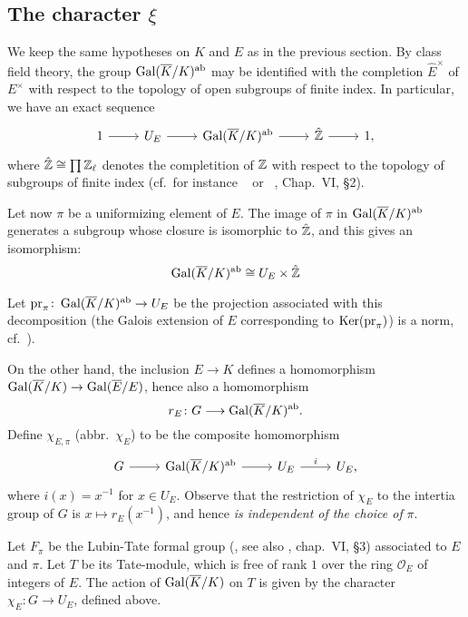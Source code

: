 \begin{subappendices}
\subsection{The character \texorpdfstring{$\xi$}{ξ}}%
\label{sec:III_A4}

We keep the same hypotheses on $K$ and $E$ as in the previous section. By class
field theory, the group $\operatorname{Gal}(\overline{K}/K)^{\mathrm{ab}}$ may be identified with the
completion $\hat{E}^\times$ of $E^\times$ with respect to the topology of open
subgroups of finite index. In particular, we have an exact sequence
\[\begin{tikzcd}
	1 \rar & U_E \rar & \abcl{\Gal(\overline{K}/K)} \rar & \hat{\Z} \rar & 1,
\end{tikzcd}\]
where $\hat{\mathbb{Z}} \cong \prod \mathbb{Z}_\ell$ denotes the completition of $\mathbb{Z}$ with
respect to the topology of subgroups of finite index (cf.\ for instance
\citeauthor{2}~\cite{2} or \citeauthor{6}~\cite{6}, Chap.~VI, \S2).

\dpage

Let now $\pi$ be a uniformizing element of $E$. The image of $\pi$ in
$\operatorname{Gal}(\overline{K}/K)^{\mathrm{ab}}$ generates a subgroup whose closure is isomorphic
to $\hat{\mathbb{Z}}$, and this gives an isomorphism:
\[
	\operatorname{Gal}(\overline{K}/K)^{\mathrm{ab}} \cong U_E \times \hat{\mathbb{Z}}
\]

Let $\operatorname{pr}_\pi \colon  \operatorname{Gal}(\overline{K}/K)^{\mathrm{ab}} \to U_E$ be the projection
associated with this decomposition (the Galois extension of $E$ corresponding to
$\operatorname{Ker}(\operatorname{pr}_\pi)$) is a norm, cf.\ \cite[144-145]{6}).

On the other hand, the inclusion $E \to K$ defines a homomorphism
$\operatorname{Gal}(\overline{K}/K) \to \operatorname{Gal}(\overline{E}/E)$, hence also a homomorphism
\[
	r_E \colon G \longrightarrow \operatorname{Gal}(\overline{K}/K)^{\mathrm{ab}}.
\]
Define $\chi_{E, \pi}$ (abbr.\ $\chi_E$) to be the composite homomorphism
\[\begin{tikzcd}
	G \rar & \abcl{\Gal(\overline{K}/K)} \rar & U_E \rar["i"] & U_E,
\end{tikzcd}\]
where $i(x) = x^{-1}$ for $x \in U_E$.
Observe that the restriction of $\chi_E$ to the intertia group of $G$ is $x
\mapsto r_E(x^{-1})$, and hence \emph{is independent of the choice of} $\pi$.

\begin{prop}\label{sec:III_A4_4}
Let $F_\pi$ be the Lubin-Tate formal group (\cite{17}, see also \cite{6},
chap.~VI, \S3) associated to $E$ and $\pi$.
Let $T$ be its Tate-module, which is free of rank $1$ over the ring
$\mathcal{O}_E$ of integers of $E$.
The action of $\operatorname{Gal}(\overline{K}/K)$ on $T$ is given by the character $\chi_E
\colon G \to U_E$, defined above.
\end{prop}


\end{subappendices}
